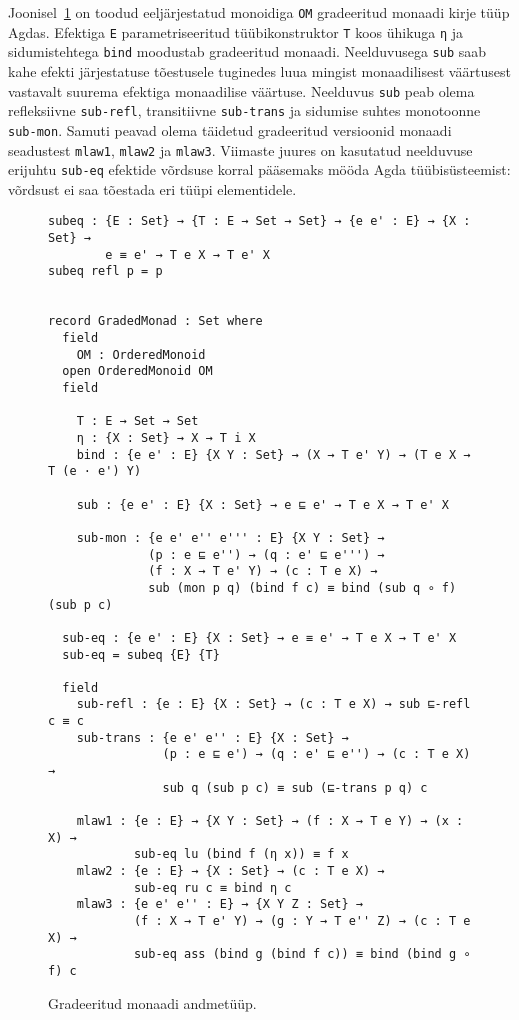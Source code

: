 \documentclass[a4paper,12pt]{article}
\begin{document}
Joonisel~\ref{fig:graded-monad} on toodud eeljärjestatud monoidiga {\tt OM} gradeeritud monaadi kirje tüüp Agdas.
Efektiga {\tt E} parametriseeritud tüübikonstruktor {\tt T} koos ühikuga {\tt η} ja sidumistehtega {\tt bind} moodustab gradeeritud monaadi.
Neelduvusega {\tt sub} saab kahe efekti järjestatuse tõestusele tuginedes luua mingist monaadilisest väärtusest vastavalt suurema efektiga monaadilise väärtuse.
Neelduvus {\tt sub} peab olema refleksiivne {\tt sub-refl}, transitiivne {\tt sub-trans} ja  sidumise suhtes monotoonne {\tt sub-mon}.
Samuti peavad olema täidetud gradeeritud versioonid monaadi seadustest {\tt mlaw1}, {\tt mlaw2} ja {\tt mlaw3}. Viimaste juures on kasutatud neelduvuse erijuhtu {\tt sub-eq} efektide võrdsuse korral pääsemaks mööda Agda tüübisüsteemist: võrdsust ei saa tõestada eri tüüpi elementidele.

\begin{figure}
  \begin{BVerbatim}
subeq : {E : Set} → {T : E → Set → Set} → {e e' : E} → {X : Set} →
        e ≡ e' → T e X → T e' X
subeq refl p = p


record GradedMonad : Set where
  field
    OM : OrderedMonoid
  open OrderedMonoid OM
  field

    T : E → Set → Set
    η : {X : Set} → X → T i X
    bind : {e e' : E} {X Y : Set} → (X → T e' Y) → (T e X → T (e · e') Y)

    sub : {e e' : E} {X : Set} → e ⊑ e' → T e X → T e' X

    sub-mon : {e e' e'' e''' : E} {X Y : Set} →
              (p : e ⊑ e'') → (q : e' ⊑ e''') → 
              (f : X → T e' Y) → (c : T e X) → 
              sub (mon p q) (bind f c) ≡ bind (sub q ∘ f) (sub p c) 

  sub-eq : {e e' : E} {X : Set} → e ≡ e' → T e X → T e' X
  sub-eq = subeq {E} {T}
 
  field
    sub-refl : {e : E} {X : Set} → (c : T e X) → sub ⊑-refl c ≡ c
    sub-trans : {e e' e'' : E} {X : Set} →
                (p : e ⊑ e') → (q : e' ⊑ e'') → (c : T e X) → 
                sub q (sub p c) ≡ sub (⊑-trans p q) c   

    mlaw1 : {e : E} → {X Y : Set} → (f : X → T e Y) → (x : X) →
            sub-eq lu (bind f (η x)) ≡ f x
    mlaw2 : {e : E} → {X : Set} → (c : T e X) →
            sub-eq ru c ≡ bind η c
    mlaw3 : {e e' e'' : E} → {X Y Z : Set} →
            (f : X → T e' Y) → (g : Y → T e'' Z) → (c : T e X) → 
            sub-eq ass (bind g (bind f c)) ≡ bind (bind g ∘ f) c 
  \end{BVerbatim}
  \caption{Gradeeritud monaadi andmetüüp.}
  \label{fig:graded-monad}
\end{figure}
\end{document}
